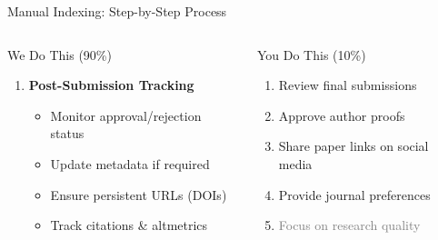 \documentclass[10pt, aspectratio=169]{beamer}
\begin{document}
\begin{frame}{Manual Indexing: Step-by-Step Process}
\begin{columns}[T]
\begin{block}{\textcolor{myblue}{We Do This (90\%)}}
\begin{enumerate}
					\item \textbf{Post-Submission Tracking}
					\begin{itemize}
						\item Monitor approval/rejection status
						\item Update metadata if required
						\item Ensure persistent URLs (DOIs)
						\item Track citations \& altmetrics
					\end{itemize}
				\end{enumerate}
			\end{block}
			
			\begin{block}{\textcolor{myorange}{You Do This (10\%)}}
				\begin{enumerate}
					\item Review final submissions
					\item Approve author proofs
					\item Share paper links on social media
					\item Provide journal preferences
					\item \textcolor{gray}{Focus on research quality}
				\end{enumerate}
			\end{block}
		\end{columns}
		
		\vspace{0.3cm}
		\begin{center}
		\end{center}
	\end{frame}
	
\end{document}
